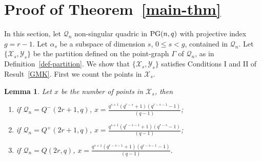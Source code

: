 \documentclass[12pt]{article}
\newtheorem{lemma}[theorem]{Lemma}
\newcommand{\X}{\mathcal X}
\newcommand{\Y}{\mathcal Y}
\newcommand\E{{\cal E}}
\newcommand{\Q}{\mathscr Q}
\newcommand\PG{{\rm PG}}
\newcommand{\Label}{\label}
\begin{document}
\section{Proof of Theorem~\ref{main-thm}}\Label{sec:pf}

%

In this section, let $\Q_n$  non-singular quadric in $\PG(n,q)$ with projective index $g=r-1$. Let $\alpha_s$ be a subspace of dimension $s$, $0\leq s<g$,  contained in $\Q_n$. Let $\{\X_s,\Y_s\}$ be the partition defined on  the point-graph $\Gamma$ of $\Q_n$, as in Definition~\ref{def-partition}. We show that $\{\X_s,\Y_s\}$ satisfies Conditions I and II of Result~\ref{GMK}. First we count the points in $\X_s$.


\begin{lemma}\Label{lemma-ell-1} Let $x$ be the number of points in  $\X_s$, then 
\begin{enumerate}
\item if  $\Q_n=Q^-(2r+1,q)$, $x=\displaystyle \frac{q^{s+1}(q^{r-s}+1)(q^{r-s-1}-1)}{(q-1)}$;\\[1mm]
\item if  $\Q_n=Q^+(2r+1,q)$, $x=\displaystyle \frac{q^{s+1}(q^{r-s-1}+1)(q^{r-s}-1)}{(q-1)}$;\\[1mm]
\item if  $\Q_n=Q(2r,q)$, $x=\displaystyle\frac{q^{s+1}(q^{r-s-1}+1)(q^{r-s-1}-1)}{(q-1)}$.
\end{enumerate}
\end{lemma}
\end{document}
